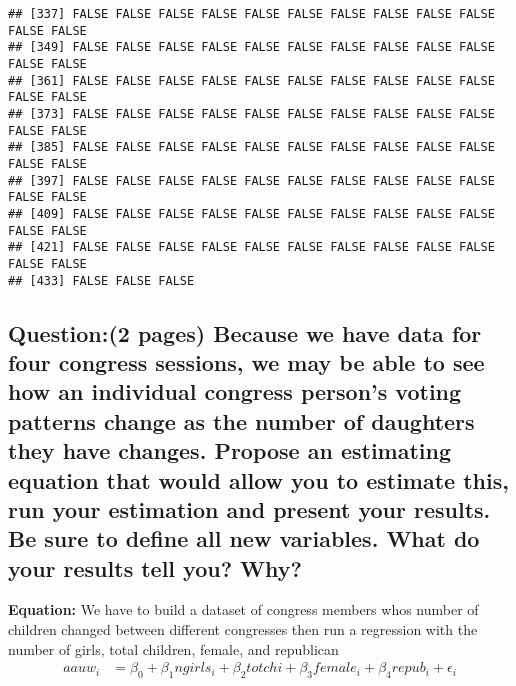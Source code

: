 \documentclass[
]{article}
\begin{document}
\begin{verbatim}
## [337] FALSE FALSE FALSE FALSE FALSE FALSE FALSE FALSE FALSE FALSE FALSE FALSE
## [349] FALSE FALSE FALSE FALSE FALSE FALSE FALSE FALSE FALSE FALSE FALSE FALSE
## [361] FALSE FALSE FALSE FALSE FALSE FALSE FALSE FALSE FALSE FALSE FALSE FALSE
## [373] FALSE FALSE FALSE FALSE FALSE FALSE FALSE FALSE FALSE FALSE FALSE FALSE
## [385] FALSE FALSE FALSE FALSE FALSE FALSE FALSE FALSE FALSE FALSE FALSE FALSE
## [397] FALSE FALSE FALSE FALSE FALSE FALSE FALSE FALSE FALSE FALSE FALSE FALSE
## [409] FALSE FALSE FALSE FALSE FALSE FALSE FALSE FALSE FALSE FALSE FALSE FALSE
## [421] FALSE FALSE FALSE FALSE FALSE FALSE FALSE FALSE FALSE FALSE FALSE FALSE
## [433] FALSE FALSE FALSE
\end{verbatim}

\clearpage

\hypertarget{question2-pages-because-we-have-data-for-four-congress-sessions-we-may-be-able-to-see-how-an-individual-congress-persons-voting-patterns-change-as-the-number-of-daughters-they-have-changes.-propose-an-estimating-equation-that-would-allow-you-to-estimate-this-run-your-estimation-and-present-your-results.-be-sure-to-define-all-new-variables.-what-do-your-results-tell-you-why}{%
\subsection{Question:(2 pages) Because we have data for four congress
sessions, we may be able to see how an individual congress person's
voting patterns change as the number of daughters they have changes.
Propose an estimating equation that would allow you to estimate this,
run your estimation and present your results. Be sure to define all new
variables. What do your results tell you?
Why?}\label{question2-pages-because-we-have-data-for-four-congress-sessions-we-may-be-able-to-see-how-an-individual-congress-persons-voting-patterns-change-as-the-number-of-daughters-they-have-changes.-propose-an-estimating-equation-that-would-allow-you-to-estimate-this-run-your-estimation-and-present-your-results.-be-sure-to-define-all-new-variables.-what-do-your-results-tell-you-why}}

\textbf{Equation:} We have to build a dataset of congress members whos
number of children changed between different congresses then run a
regression with the number of girls, total children, female, and
republican \[
\begin{aligned}
  aauw_i&=\beta_0+\beta_1ngirls_i+\beta_2totchi+\beta_3female_i+\beta_4repub_i+\epsilon_i\\
\end{aligned}
\]
\end{document}
